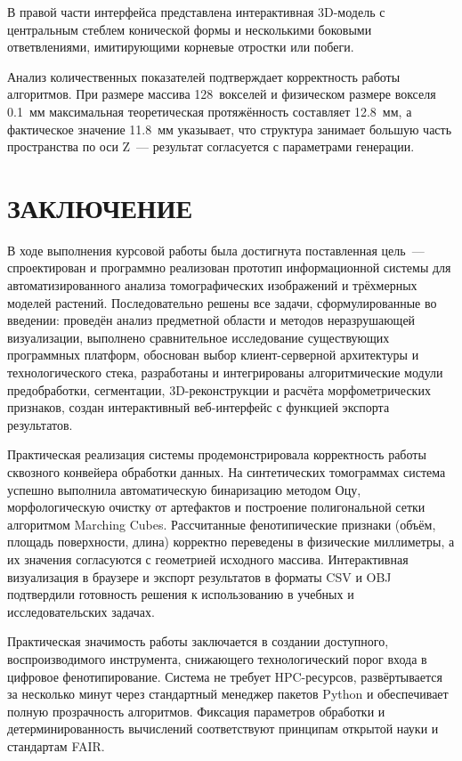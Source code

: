 \documentclass[14pt,a4paper]{extreport}
\begin{document}
В правой части интерфейса представлена интерактивная 3D-модель с центральным стеблем конической формы и несколькими боковыми ответвлениями, имитирующими корневые отростки или побеги.

Анализ количественных показателей подтверждает корректность работы алгоритмов. При размере массива 128~вокселей и физическом размере вокселя 0.1~мм максимальная теоретическая протяжённость составляет 12.8~мм, а фактическое значение 11.8~мм указывает, что структура занимает большую часть пространства по оси Z~--- результат согласуется с параметрами генерации.

\newpage

\chapter*{ЗАКЛЮЧЕНИЕ}

В ходе выполнения курсовой работы была достигнута поставленная цель~--- спроектирован и программно реализован прототип информационной системы для автоматизированного анализа томографических изображений и трёхмерных моделей растений. Последовательно решены все задачи, сформулированные во введении: проведён анализ предметной области и методов неразрушающей визуализации, выполнено сравнительное исследование существующих программных платформ, обоснован выбор клиент-серверной архитектуры и технологического стека, разработаны и интегрированы алгоритмические модули предобработки, сегментации, 3D-реконструкции и расчёта морфометрических признаков, создан интерактивный веб-интерфейс с функцией экспорта результатов.

Практическая реализация системы продемонстрировала корректность работы сквозного конвейера обработки данных. На синтетических томограммах система успешно выполнила автоматическую бинаризацию методом Оцу, морфологическую очистку от артефактов и построение полигональной сетки алгоритмом Marching Cubes. Рассчитанные фенотипические признаки (объём, площадь поверхности, длина) корректно переведены в физические миллиметры, а их значения согласуются с геометрией исходного массива. Интерактивная визуализация в браузере и экспорт результатов в форматы CSV и OBJ подтвердили готовность решения к использованию в учебных и исследовательских задачах.

Практическая значимость работы заключается в создании доступного, воспроизводимого инструмента, снижающего технологический порог входа в цифровое фенотипирование. Система не требует HPC-ресурсов, развёртывается за несколько минут через стандартный менеджер пакетов Python и обеспечивает полную прозрачность алгоритмов. Фиксация параметров обработки и детерминированность вычислений соответствуют принципам открытой науки и стандартам FAIR.
\end{document}
